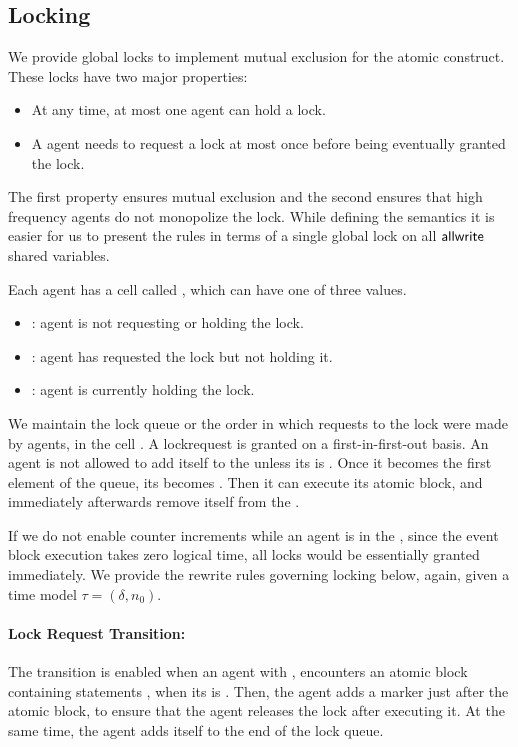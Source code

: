 \subsection[h]{Locking}
\label{sect:locking}
We provide global locks to implement mutual exclusion for the atomic construct. 
	These locks have two major properties:
    \begin{itemize}
\item At any time, at most one agent can hold a lock. 
\item A agent needs to request a lock at most once before being eventually granted the lock. 
\end{itemize}
The first property ensures mutual exclusion and the second ensures that high frequency agents do not monopolize the lock. 
While defining the semantics it is easier for us to present the rules in terms of a single global lock on all $\sf{allwrite}$ shared variables. 

Each agent has a cell called , which can have one of three values.    
\begin{itemize}
\item {} : agent is not requesting or holding the lock. 
\item {} : agent has requested the lock but not holding it.
\item {} :  agent is currently holding the lock. 
\end{itemize}

We maintain the lock queue or the order in which requests to the lock were made by agents, in the cell . A lockrequest is granted on a first-in-first-out basis. An agent is not allowed to add itself to the  unless its  is . Once it becomes the first element of the queue, its  becomes . Then it can execute its atomic block, and immediately afterwards remove itself from the . 

If we do not enable  counter increments while an agent is in the , since the event block execution takes zero logical time, all locks would be essentially granted immediately. We provide the rewrite rules governing locking below, again, given a time model $\tau = (\delta,n_0)$. 

\paragraph{Lock Request Transition:} The  transition is enabled when an agent with  , encounters an atomic block containing statements , when its  is . Then, the agent adds a marker  just after the atomic block, to ensure that the agent releases the lock after executing it. At the same time, the agent adds itself to the end of the lock queue.

